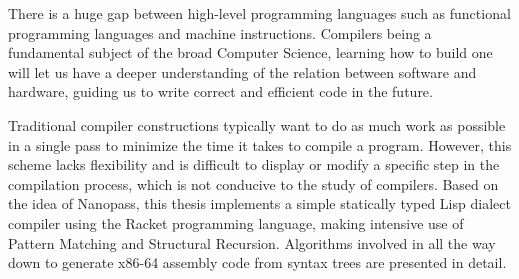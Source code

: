 \begin{abstract*}

\begin{comment}
  This is a sample document of HFUT thesis \LaTeX{} template for bachelor,
  master and doctor. The template is created by \href{https://github.com/LaureatePoet}{LaureatePoet} and \href{https://github.com/HowardZorn}{Fw[a]rd}. The
  template meets the equirements of HFUT thesis writing standards.

  This document will show the usage of basic commands provided by \LaTeX{} and
  some features provided by the template. For more information, please refer to
  the template document hfutthesis-doc.pdf.
\end{comment}

  \noindent %
There is a huge gap between high-level programming languages
such as functional programming languages and machine instructions.
Compilers being a fundamental subject of the broad Computer Science,
learning how to build one will let us have a deeper understanding
of the relation between software and hardware,
guiding us to write correct and efficient code in the future.

Traditional compiler constructions typically want to do
as much work as possible in a single pass to minimize the time
it takes to compile a program. However, this scheme lacks flexibility
and is difficult to display or modify a specific step in the
compilation process, which is not conducive to the study of compilers.
Based on the idea of Nanopass, this thesis implements
a simple statically typed Lisp dialect compiler
using the Racket programming language,
making intensive use of Pattern Matching and Structural Recursion.
Algorithms involved in all the way down to generate x86-64 assembly code
from syntax trees are presented in detail.

\end{abstract*}
